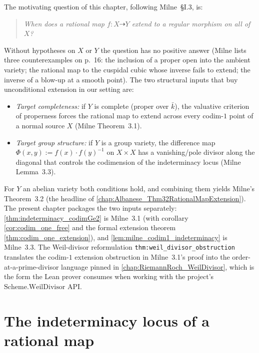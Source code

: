 The motivating question of this chapter, following Milne~\S I.3, is:
\begin{quote}
  \emph{When does a rational map \(f \colon X \dashrightarrow Y\) extend to a regular
  morphism on all of \(X\)?}
\end{quote}
Without hypotheses on \(X\) or \(Y\) the question has no positive answer (Milne lists three
counterexamples on p.~16: the inclusion of a proper open into the ambient variety; the
rational map to the cuspidal cubic whose inverse fails to extend; the inverse of a
blow-up at a smooth point). The two structural inputs that buy unconditional extension
in our setting are:
\begin{itemize}
  \item \emph{Target completeness:} if \(Y\) is complete (proper over \(\bar k\)), the
    valuative criterion of properness forces the rational map to extend across every
    codim-\(1\) point of a normal source \(X\) (Milne Theorem~3.1).
  \item \emph{Target group structure:} if \(Y\) is a group variety, the difference map
    \(\Phi(x, y) := f(x) \cdot f(y)^{-1}\) on \(X \times X\) has a vanishing/pole divisor
    along the diagonal that controls the codimension of the indeterminacy locus
    (Milne Lemma~3.3).
\end{itemize}
For \(Y\) an abelian variety both conditions hold, and combining them yields Milne's
Theorem~3.2 (the headline of \cref{chap:Albanese_Thm32RationalMapExtension}). The
present chapter packages the two inputs separately:
\cref{thm:indeterminacy_codimGe2} is Milne~3.1 (with corollary
\cref{cor:codim_one_free} and the formal extension theorem
\cref{thm:codim_one_extension}), and
\cref{lem:milne_codim1_indeterminacy} is Milne~3.3. The Weil-divisor reformulation
\texttt{thm:weil_divisor_obstruction} translates the codim-\(1\) extension obstruction
in Milne~3.1's proof into the order-at-a-prime-divisor language pinned in
\cref{chap:RiemannRoch_WeilDivisor}, which is the form the Lean prover consumes when
working with the project's \(\mathrm{Scheme.WeilDivisor}\) API.

\section{The indeterminacy locus of a rational map}
\label{sec:indeterm_locus}

